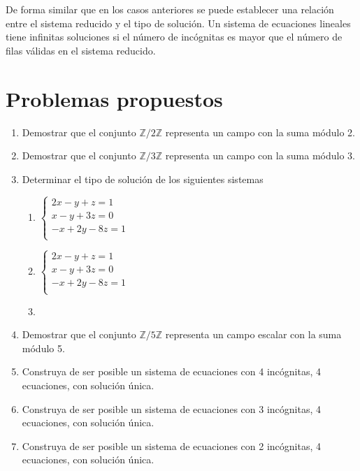 De forma similar que en los casos anteriores se puede establecer una relación entre el sistema reducido y el tipo de solución. Un sistema de ecuaciones lineales tiene infinitas soluciones si el número de incógnitas es mayor que el número de filas válidas en el sistema reducido.
\newpage
\section{Problemas propuestos}


\begin{enumerate}[1.]
\item Demostrar que el conjunto $\mathbb{Z}/2\mathbb{Z}$ representa un campo con la suma módulo 2.
\item Demostrar que el conjunto $\mathbb{Z}/3\mathbb{Z}$ representa un campo con la suma módulo 3.
\item Determinar el tipo de solución de los siguientes sistemas

\begin{enumerate}
\item $\left\lbrace \begin{aligned}
2x-y+z=1\\
x-y+3z=0\\
-x+2y-8z=1\\
\end{aligned}\right.$
\item $\left\lbrace \begin{aligned}
2x-y+z=1\\
x-y+3z=0\\
-x+2y-8z=1\\
\end{aligned}\right.$
\item {}

\end{enumerate}
\item Demostrar que el conjunto $\mathbb{Z}/5\mathbb{Z}$ representa un campo escalar con la suma módulo 5.
\item Construya de ser posible un sistema de ecuaciones con 4 incógnitas, 4 ecuaciones, con solución única.
\item Construya de ser posible un sistema de ecuaciones con 3 incógnitas, 4 ecuaciones, con solución única.
\item Construya de ser posible un sistema de ecuaciones con 2 incógnitas, 4 ecuaciones, con solución única.

\end{enumerate}
